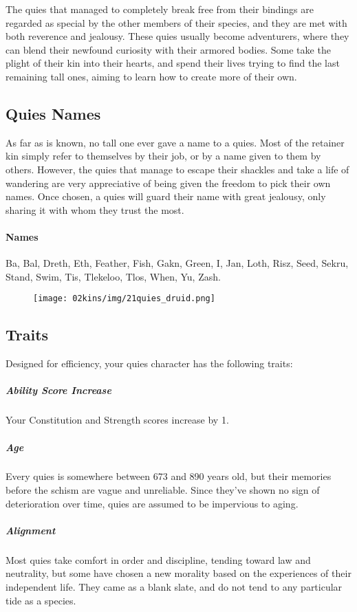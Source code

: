 \begin{linenumbers}
The quies that managed to completely break free from their bindings are regarded as special by the other members of their species, and they are met with both reverence and jealousy.
These quies usually become adventurers, where they can blend their newfound curiosity with their armored bodies.
Some take the plight of their kin into their hearts, and spend their lives trying to find the last remaining tall ones, aiming to learn how to create more of their own.

\subsection*{Quies Names}
As far as is known, no tall one ever gave a name to a quies.
Most of the retainer kin simply refer to themselves by their job, or by a name given to them by others.
However, the quies that manage to escape their shackles and take a life of wandering are very appreciative of being given the freedom to pick their own names.
Once chosen, a quies will guard their name with great jealousy, only sharing it with whom they trust the most.

\paragraph{Names} Ba, Bal, Dreth, Eth, Feather, Fish, Gakn, Green, I, Jan, Loth, Risz, Seed, Sekru, Stand, Swim, Tis, Tlekeloo, Tlos, When, Yu, Zash.

\begin{figure}[!t]
    \centering
    \texttt{[image: 02kins/img/21quies\_druid.png]}
\end{figure}

\subsection*{Traits}
Designed for efficiency, your quies character has the following traits:

\subparagraph{Ability Score Increase} Your Constitution and Strength scores increase by 1.

\subparagraph{Age} Every quies is somewhere between 673 and 890 years old, but their memories before the schism are vague and unreliable.
Since they've shown no sign of deterioration over time, quies are assumed to be impervious to aging.

\subparagraph{Alignment} Most quies take comfort in order and discipline, tending toward law and neutrality, but some have chosen a new morality based on the experiences of their independent life.
They came as a blank slate, and do not tend to any particular tide as a species.


\end{linenumbers}
